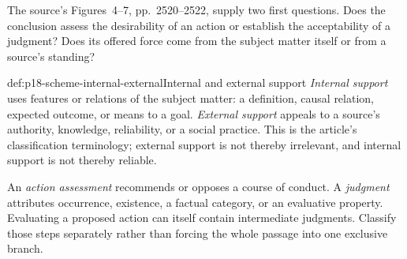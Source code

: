 The source's Figures~4--7, pp.~2520--2522, supply two first questions.
Does the conclusion assess the desirability of an action or establish
the acceptability of a judgment? Does its offered force come from the
subject matter itself or from a source's standing?

\begin{hbdefinition}{def:p18-scheme-internal-external}{Internal and external support}
\emph{Internal support} uses features or relations of the subject
matter: a definition, causal relation, expected outcome, or means to
a goal. \emph{External support} appeals to a source's authority,
knowledge, reliability, or a social practice. This is the article's
classification terminology; external support is not thereby irrelevant,
and internal support is not thereby reliable.

An \emph{action assessment} recommends or opposes a course of conduct.
A \emph{judgment} attributes occurrence, existence, a factual category,
or an evaluative property. Evaluating a proposed action can itself
contain intermediate judgments. Classify those steps separately rather
than forcing the whole passage into one exclusive branch.
\end{hbdefinition}


